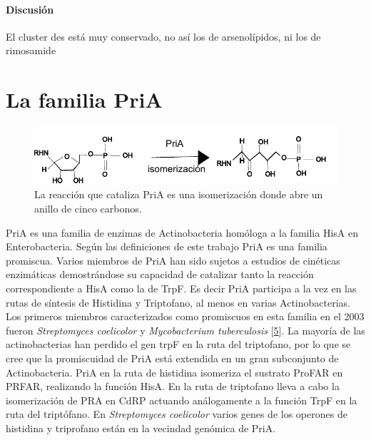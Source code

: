 \documentclass[12pt,twoside]{reedthesis}
\begin{document}
  \subsubsection{Discusión}\label{discusion}
  
  El cluster des está muy conservado, no así los de arsenolípidos, ni los
  de rimosamide
  
  \chapter{La familia PriA}\label{la-familia-pria}
  
  \begin{figure}[h!tbp]
  \centering
  \includegraphics[angle = 0,scale = 1]{chapter4/isomerizacion.pdf}
  \caption[La reacción que cataliza PriA es una isomerización donde abre un anillo de cinco carbonos.]{\footnotesize{La reacción que cataliza PriA es una isomerización donde abre un anillo de cinco carbonos.}}
  \label{fig:isomerizacion}
  \end{figure}
  
  PriA es una familia de enzimas de Actinobacteria homóloga a la familia
  HisA en Enterobacteria. Según las definiciones de este trabajo PriA es
  una familia promiscua. Varios miembros de PriA han sido sujetos a
  estudios de cinéticas enzimáticas demostrándose su capacidad de
  catalizar tanto la reacción correspondiente a HisA como la de TrpF. Es
  decir PriA participa a la vez en las rutas de síntesis de Histidina y
  Triptofano, al menos en varias Actinobacterias. Los primeros miembros
  caracterizados como promiscuos en esta familia en el 2003 fueron
  \emph{Streptomyces coelicolor} y \emph{Mycobacterium tuberculosis}
  {[}\protect\hyperlink{ref-baronagomez_occurrence_2003}{5}{]}. La mayoría
  de las actinobacterias han perdido el gen trpF en la ruta del
  triptofano, por lo que se cree que la promiscuidad de PriA está
  extendida en un gran subconjunto de Actinobacteria. PriA en la ruta de
  histidina isomeriza el sustrato ProFAR en PRFAR, realizando la función
  HisA. En la ruta de triptofano lleva a cabo la isomerización de PRA en
  CdRP actuando análogamente a la función TrpF en la ruta del triptófano.
  En \emph{Streptomyces coelicolor} varios genes de los operones de
  histidina y triprofano están en la vecindad genómica de PriA.
  
\end{document}
